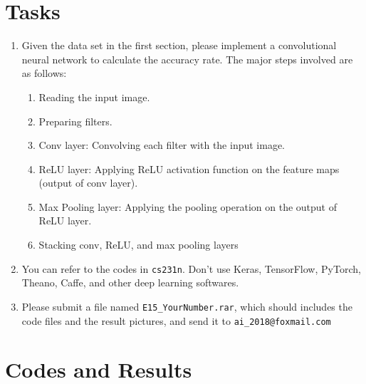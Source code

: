 ﻿\documentclass[a4paper, 11pt]{article}
\begin{document}
\section{Tasks}
\begin{enumerate}
	\item Given the data set in the first section, please implement a convolutional neural network to calculate the accuracy rate. The major steps involved are as follows:
	\begin{enumerate}
		\item Reading the input image.
		\item Preparing filters.
		\item Conv layer: Convolving each filter with the input image.
		\item ReLU layer: Applying ReLU activation function on the feature maps (output of conv layer).
		\item Max Pooling layer: Applying the pooling operation on the output of ReLU layer.
		\item Stacking conv, ReLU, and max pooling layers
	\end{enumerate}
	\item You can refer to the codes in \texttt{cs231n}. Don't use Keras, TensorFlow, PyTorch, Theano, Caffe, and other deep learning softwares. 
	\item Please submit a file named \texttt{E15\_YourNumber.rar}, which should includes the code files and the result pictures, and send it to \texttt{ai\_2018@foxmail.com}
\end{enumerate}
\section{Codes and Results}


%
%
\end{document}
